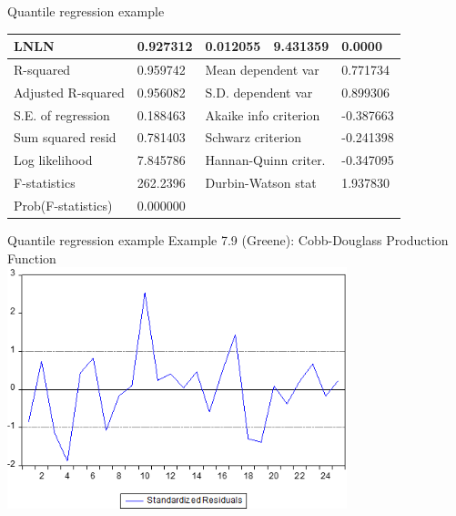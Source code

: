 \documentclass{beamer}
\begin{document}
\begin{frame}{Quantile regression example}
\begin{table}[]
\begin{tabular}{@{}lllll@{}}
LNLN                                         & 0.927312                             & 0.012055                           & 9.431359                             & 0.0000                             \\
\midrule
R-squared                                    & 0.959742                             & \multicolumn{2}{l}{Mean dependent var}                                    & 0.771734                           \\
Adjusted R-squared                           & 0.956082                             & \multicolumn{2}{l}{S.D. dependent var}                                    & 0.899306                           \\
S.E. of regression                           & 0.188463                             & \multicolumn{2}{l}{Akaike info criterion}                                 & -0.387663                          \\
Sum squared resid                            & 0.781403                             & \multicolumn{2}{l}{Schwarz criterion}                                     & -0.241398                          \\
Log likelihood                               & 7.845786                             & \multicolumn{2}{l}{Hannan-Quinn criter.}                                  & -0.347095                          \\
F-statistics                                 & 262.2396                             & \multicolumn{2}{l}{Durbin-Watson stat}                                    & 1.937830                           \\
Prob(F-statistics)                           & 0.000000                             & \multicolumn{2}{l}{}                                                      &                                    \\ \bottomrule
\end{tabular}
\end{table}
\end{frame}
\begin{frame}{Quantile regression example}
Example 7.9 (Greene): Cobb-Douglass Production Function\\
\includegraphics[width=\textwidth, height=7cm]{img/Obrazek5}
\end{frame}
\end{document}
